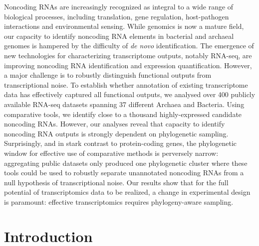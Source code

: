 \documentclass[10pt]{article}
\begin{document}
Noncoding RNAs are increasingly recognized as integral to a wide range
of biological processes, including translation, gene regulation,
host-pathogen interactions and environmental sensing. While genomics
is now a mature field, our capacity to identify noncoding RNA elements
in bacterial and archaeal genomes is hampered by the difficulty of \emph{de
novo} identification. The emergence of new technologies for
characterizing transcriptome outputs, notably RNA-seq, are improving
noncoding RNA identification and expression quantification. However, a
major challenge is to robustly distinguish functional outputs from
transcriptional noise. To establish whether annotation of existing
transcriptome data has effectively captured all functional outputs, we
analysed over 400 publicly available RNA-seq datasets spanning 37 different
Archaea and Bacteria. Using comparative tools, we identify close to a
thousand highly-expressed candidate noncoding RNAs. However, our
analyses reveal that capacity to identify noncoding RNA outputs is
strongly dependent on phylogenetic sampling. Surprisingly, and in
stark contrast to protein-coding genes, the phylogenetic window for
effective use of comparative methods is perversely narrow: aggregating
public datasets only produced one phylogenetic cluster where these
tools could be used to robustly separate unannotated noncoding RNAs
from a null hypothesis of transcriptional noise. Our results show that
for the full potential of transcriptomics data to be realized, a
change in experimental design is paramount: effective transcriptomics
requires phylogeny-aware sampling.



\section*{Introduction}
\end{document}
